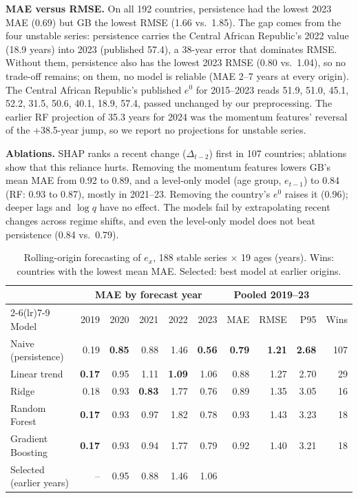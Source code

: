 \documentclass[runningheads]{llncs}
\begin{document}
\textbf{MAE versus RMSE.} On all 192 countries, persistence had the lowest 2023 MAE (0.69) but GB
the lowest RMSE (1.66 vs.\ 1.85). The gap comes from the four unstable series: persistence carries
the Central African Republic's 2022 value (18.9 years) into 2023 (published 57.4), a 38-year error
that dominates RMSE. Without them, persistence also has the lowest 2023 RMSE (0.80 vs.\ 1.04), so
no trade-off remains; on them, no model is reliable (MAE 2--7 years at every origin). The Central
African Republic's published $e^0$ for 2015--2023 reads 51.9, 51.0, 45.1, 52.2, 31.5, 50.6, 40.1,
18.9, 57.4, passed unchanged by our preprocessing. The earlier RF projection of 35.3 years for 2024
was the momentum features' reversal of the +38.5-year jump, so we report no projections for
unstable series.

\textbf{Ablations.} SHAP ranks a recent change ($\Delta_{t-2}$) first in 107 countries; ablations
show that this reliance hurts. Removing the momentum features lowers GB's mean MAE from 0.92 to
0.89, and a level-only model (age group, $e_{t-1}$) to 0.84 (RF: 0.93 to 0.87), mostly in 2021--23.
Removing the country's $e^0$ raises it (0.96); deeper lags and $\log q$ have no effect. The models
fail by extrapolating recent changes across regime shifts, and even the level-only model does not
beat persistence (0.84 vs.\ 0.79).

\begin{table}[t]
\centering
\caption{Rolling-origin forecasting of $e_x$, 188 stable series $\times$ 19 ages (years). Wins:
countries with the lowest mean MAE. Selected: best model at earlier origins.}\label{tab:forecast}
\scriptsize\setlength{\tabcolsep}{4pt}
\begin{tabular}{@{}lrrrrrrrrr@{}}
\toprule
 & \multicolumn{5}{c}{MAE by forecast year} & \multicolumn{3}{c}{Pooled 2019--23} & \\
\cmidrule(lr){2-6}\cmidrule(lr){7-9}
Model & 2019 & 2020 & 2021 & 2022 & 2023 & MAE & RMSE & P95 & Wins \\
\midrule
Naive (persistence) & 0.19 & \textbf{0.85} & 0.88 & 1.46 & \textbf{0.56} & \textbf{0.79} & \textbf{1.21} & \textbf{2.68} & 107 \\
Linear trend & \textbf{0.17} & 0.95 & 1.11 & \textbf{1.09} & 1.06 & 0.88 & 1.27 & 2.70 & 29 \\
Ridge & 0.18 & 0.93 & \textbf{0.83} & 1.77 & 0.76 & 0.89 & 1.35 & 3.05 & 16 \\
Random Forest & \textbf{0.17} & 0.93 & 0.97 & 1.82 & 0.78 & 0.93 & 1.43 & 3.23 & 18 \\
Gradient Boosting & \textbf{0.17} & 0.93 & 0.94 & 1.77 & 0.79 & 0.92 & 1.40 & 3.21 & 18 \\
Selected (earlier years) & -- & 0.95 & 0.88 & 1.46 & 1.06 & & & & \\
\bottomrule
\end{tabular}
\end{table}
\end{document}
